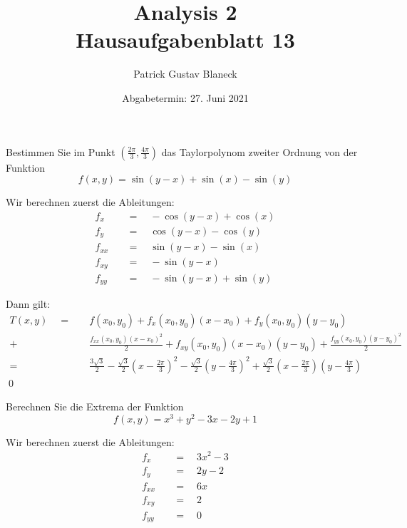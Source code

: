 \documentclass[answers]{exam}
\title{Analysis 2 \\ \large{Hausaufgabenblatt 13}}
\author{Patrick Gustav Blaneck}
\date{Abgabetermin: 27. Juni 2021}
\begin{document}
\maketitle
\begin{questions}
    \question
    Bestimmen Sie im Punkt $(\frac{2\pi}{3}, \frac{4\pi}{3})$ das Taylorpolynom zweiter Ordnung von der Funktion
    $$
        f(x, y) = \sin(y - x) + \sin(x) - \sin(y)
    $$
    \begin{solution}
        Wir berechnen zuerst die Ableitungen:
        $$
            \begin{aligned}
                f_x \quad    & = \quad -\cos(y-x) + \cos(x) \\
                f_y \quad    & = \quad \cos(y-x) - \cos(y)  \\
                f_{xx} \quad & = \quad \sin(y-x) - \sin(x)  \\
                f_{xy} \quad & = \quad -\sin(y-x)           \\
                f_{yy} \quad & = \quad -\sin(y-x) + \sin(y)
            \end{aligned}
        $$

        Dann gilt:
        $$
            \begin{aligned}
                T(x, y) \quad = \quad & f(x_0, y_0) + f_x(x_0, y_0) (x-x_0) + f_y(x_0, y_0) (y-y_0)                                                                                                                                                  \\
                + \quad               & \frac{f_{xx}(x_0, y_0) (x-x_0)^2}{2} + f_{xy}(x_0, y_0) (x-x_0) (y-y_0) + \frac{f_{yy}(x_0, y_0) (y-y_0)^2}{2}                                                                                               \\
                = \quad               & \frac{3\sqrt{3}}{2} - \frac{\sqrt{3}}{2}\left(x - \frac{2\pi}{3}\right)^2 - \frac{\sqrt{3}}{2}\left(y-\frac{4\pi}{3}\right)^2 + \frac{\sqrt{3}}{2}\left(x-\frac{2\pi}{3}\right)\left(y-\frac{4\pi}{3}\right)
            \end{aligned}
        $$\qed
    \end{solution}

    \newpage
    \question
    Berechnen Sie die Extrema der Funktion
    $$
        f(x, y) = x^3 + y^2 - 3x -2y + 1
    $$
    \begin{solution}
        Wir berechnen zuerst die Ableitungen:
        $$
            \begin{aligned}
                f_x \quad    & = \quad 3x^2 - 3 \\
                f_y \quad    & = \quad 2y - 2   \\
                f_{xx} \quad & = \quad 6x       \\
                f_{xy} \quad & = \quad 2        \\
                f_{yy} \quad & = \quad 0
            \end{aligned}
        $$


\end{solution}
\end{questions}
\end{document}

